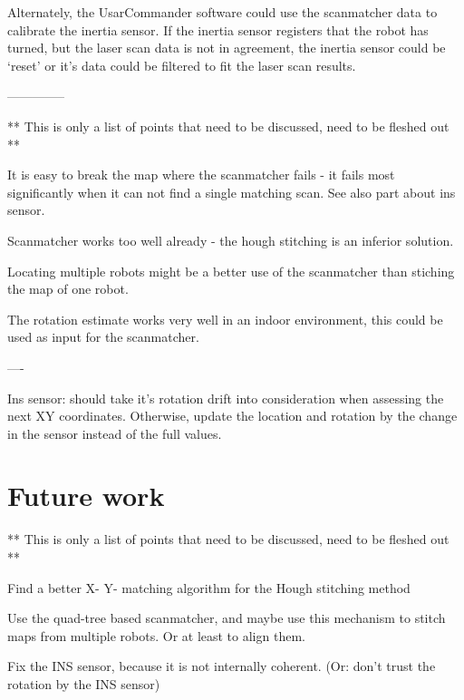 Alternately, the UsarCommander software could use the scanmatcher data to calibrate the inertia sensor. If the inertia sensor registers that the robot has turned, but the laser scan data is not in agreement, the inertia sensor could be `reset' or it's data could be filtered to fit the laser scan results.



--------------

** This is only a list of points that need to be discussed, need to be fleshed out **

It is easy to break the map where the scanmatcher fails - it fails most significantly when it can not find a single matching scan. See also part about ins sensor.

Scanmatcher works too well already - the hough stitching is an inferior solution.

Locating multiple robots might be a better use of the scanmatcher than stiching the map of one robot.

The rotation estimate works very well in an indoor environment, this could be used as input for the scanmatcher.

----

Ins sensor: should take it's rotation drift into consideration when assessing the next XY coordinates. Otherwise, update the location and rotation by the change in the sensor instead of the full values.

\section{Future work}
\label{futurework}

** This is only a list of points that need to be discussed, need to be fleshed out **

Find a better X- Y- matching algorithm for the Hough stitching method

Use the quad-tree based scanmatcher, and maybe use this mechanism to stitch maps from multiple robots. Or at least to align them.

Fix the INS sensor, because it is not internally coherent. (Or: don't trust the rotation by the INS sensor)

